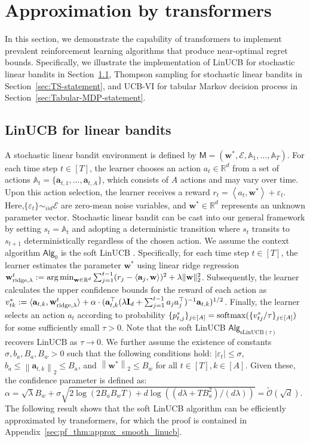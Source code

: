 \documentclass[10pt]{article}
\newcommand{\id}{\bI}
\newcommand{\eps}{\varepsilon}
\DeclareMathOperator*{\argmin}{arg\,min}
\newcommand{\norm}[1]{\left\|{#1}\right\|}
\newcommand{\ltwo}[1]{\norm{#1}_2}
\newcommand{\<}{\left\langle}
\renewcommand{\>}{\right\rangle}
\newcommand{\ridge}{{\rm ridge}}
\newcommand{\R}{\mathbb{R}}
\newcommand{\inst}{{\mathsf{M}}}
\newcommand{\sLinUCB}{{\mathrm{sLinUCB}}}
\newcommand{\temp}{{\tau}}
\newcommand{\cwid}{{\alpha}}
\newcommand{\tcO}{{\tilde{\mathcal O}}}
\newcommand{\action}{{a}}
\newcommand{\reward}{{r}}
\newcommand{\totlen}{{T}}
\newcommand{\softmax}{{\rm softmax}}
\newcommand{\sAlg}{{\mathsf{Alg}}}
\newcommand{\aset}{{\sA}}
\newcommand{\TrueLBPar}{{\bw^*}}
\newcommand{\Noise}{{\eps}}
\newcommand{\Noisedist}{{\mathcal{E}}}
\newcommand{\Numact}{{A}}
\def\sA{{\mathbb{A}}}
\def\bI{{\mathbf I}}
\def\ba{{\mathbf a}}
\def\bw{{\mathbf w}}
\begin{document}
\section{Approximation by transformers}\label{sec:ICRL}
In this section, we demonstrate the capability of transformers to implement prevalent reinforcement learning algorithms that produce near-optimal regret bounds. Specifically, we illustrate the implementation of LinUCB for stochastic linear bandits in Section~\ref{sec:LinUCB-statement}, Thompson sampling for stochastic linear bandits in Section~\ref{sec:TS-statement}, and UCB-VI for tabular Markov decision process in Section~\ref{sec:Tabular-MDP-statement}.
\subsection{LinUCB for linear bandits}\label{sec:LinUCB-statement}
A stochastic linear bandit environment is defined by $\inst=(\TrueLBPar,\Noisedist,\aset_1,\ldots,\aset_\totlen)$. For each time step $t\in[\totlen]$, the learner chooses an action $\action_t\in\R^{d}$ from a set of actions $\sA_t=\{\ba_{t,1},\ldots,\ba_{t,\Numact}\}$, which consists of $\Numact$ actions and may vary over time. Upon this action selection, the learner receives a reward $\reward_t=\<\action_t,\TrueLBPar\>+\Noise_t$. Here,$\{ \Noise_t \} \sim_{ iid} \Noisedist$ are zero-mean noise variables, and $\TrueLBPar\in\R^{d}$ represents an unknown parameter vector. Stochastic linear bandit can be cast into our general framework by setting $s_t = \aset_t$ and adopting a deterministic transition where $s_t$ transits to $s_{t+1}$ deterministically regardless of the chosen action.
We assume the context algorithm $\sAlg_0$ is the soft LinUCB \citep{chu2011contextual}. Specifically, for each time step $t\in[\totlen]$, the learner estimates the parameter $\TrueLBPar$ using linear ridge regression $\bw^t_{\ridge,\lambda}:=\argmin_{\bw\in\R^d} \sum_{j=1}^{t-1}(\reward_j-\<\ba_j,\bw\>)^2+ \lambda \|\bw\|_2^2$. Subsequently, the learner calculates the upper confidence bounds for the reward of each action as $v^*_{tk}:=\langle \ba_{t,k},\bw^t_{\ridge,\lambda}\rangle +\cwid \cdot (\ba_{t,k}^\top (\lambda\id_d+\sum_{j=1}^{t-1}\action_j\action_j^\top)^{-1}  \ba_{t,k})^{1/2}$. Finally, the learner selects an action $\action_t$ according to probability $\{ p^*_{t,j} \}_{j \in [\Numact]} = \softmax(\{v^*_{tj}/\temp \}_{j \in [\Numact]})$ for some sufficiently small $\temp>0$. Note that the soft LinUCB $\sAlg_{\sLinUCB(\temp)}$ recovers LinUCB as $\temp\to 0$.
We further assume the existence of constants $\sigma,b_a,B_a,B_w>0$ such that the following conditions hold:   $|\Noise_t|\leq\sigma$, $b_a\leq\ltwo{\ba_{t,k}}\leq B_a$, and $\ltwo{\bw^*}\le B_w$ for all $t\in[\totlen],k\in[\Numact]$. Given these, the confidence parameter is defined as: $\cwid=\sqrt{\lambda}B_w+\sigma\sqrt{2\log (2B_aB_w \totlen )+d\log((d\lambda+\totlen B_a^2)/(d\lambda))} = \tcO(\sqrt{d})$. The following result shows that the soft LinUCB algorithm can be efficiently approximated by transformers, for which the proof is contained in Appendix~\ref{sec:pf_thm:approx_smooth_linucb}.
\end{document}
